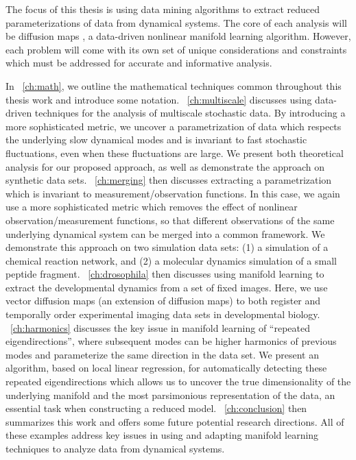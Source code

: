 The focus of this thesis is using data mining algorithms to extract reduced parameterizations of data from dynamical systems.
%
The core of each analysis will be diffusion maps \citep{Coifman2006}, a data-driven nonlinear manifold learning algorithm.
%
However, each problem will come with its own set of unique considerations and constraints which must be addressed for accurate and informative analysis.

In \chap~\ref{ch:math}, we outline the mathematical techniques common throughout this thesis work and introduce some notation.
%
\chap~\ref{ch:multiscale} discusses using data-driven techniques for the analysis of multiscale stochastic data.
%
By introducing a more sophisticated metric, we uncover a parametrization of data which respects the underlying slow dynamical modes and is invariant to fast stochastic fluctuations, even when these fluctuations are large.
%
We present both theoretical analysis for our proposed approach, as well as demonstrate the approach on synthetic data sets.
%
\chap~\ref{ch:merging} then discusses extracting a parametrization which is invariant to measurement/observation functions.
%
In this case, we again use a more sophisticated metric which removes the effect of nonlinear observation/measurement functions, so that different observations of the same underlying dynamical system can be merged into a common framework.
%
We demonstrate this approach on two simulation data sets: (1) a simulation of a chemical reaction network, and (2) a molecular dynamics simulation of a small peptide fragment.
%
\chap~\ref{ch:drosophila} then discusses using manifold learning to extract the developmental dynamics from a set of fixed images.
%
Here, we use vector diffusion maps (an extension of diffusion maps) to both register and temporally order experimental imaging data sets in developmental biology.
%
\chap~\ref{ch:harmonics} discusses the key issue in manifold learning of ``repeated eigendirections'', where subsequent modes can be higher harmonics of previous modes and parameterize the same direction in the data set.
%
We present an algorithm, based on local linear regression, for automatically detecting these repeated eigendirections which allows us to uncover the true dimensionality of the underlying manifold and the most parsimonious representation of the data, an essential task when constructing a reduced model.
%
\chap~\ref{ch:conclusion} then summarizes this work and offers some future potential research directions.
%
All of these examples address key issues in using and adapting manifold learning techniques to analyze data from dynamical systems. 